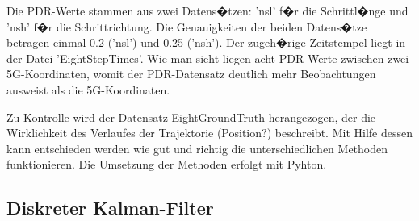 Die PDR-Werte stammen aus zwei Datens�tzen: 'nsl' f�r die Schrittl�nge und 'nsh' f�r die Schrittrichtung. Die Genauigkeiten der beiden Datens�tze betragen einmal 0.2 ('nsl') und 0.25 ('nsh'). Der zugeh�rige Zeitstempel liegt in der Datei 'EightStepTimes'. Wie man sieht liegen acht PDR-Werte zwischen zwei 5G-Koordinaten, womit der PDR-Datensatz deutlich mehr Beobachtungen ausweist als die 5G-Koordinaten. 

Zu Kontrolle wird der Datensatz EightGroundTruth herangezogen, der die Wirklichkeit des Verlaufes der Trajektorie (Position?) beschreibt. Mit Hilfe dessen kann entschieden werden wie gut und richtig die unterschiedlichen Methoden funktionieren. Die Umsetzung der Methoden erfolgt mit Pyhton.

\subsection{Diskreter Kalman-Filter}

